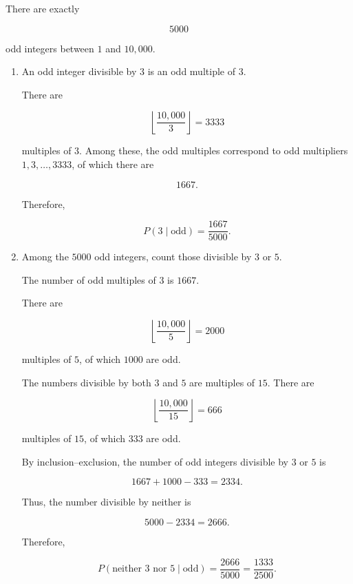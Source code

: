 \documentclass[11pt]{article}
\newenvironment{solution}{
    \par
    \begin{tcolorbox}[
        colback=white,
        colframe=uwgold,
        boxrule=0.7pt,
        arc=2mm,
        left=3mm,
        right=3mm,
        top=2mm,
        bottom=2mm,
        breakable,
        before skip=0.5em,
        after skip=1em,
        title=\textbf{Solution},
        coltitle=uwpurple,
        fonttitle=\bfseries
    ]
}{
    \end{tcolorbox}
}
\begin{document}
\begin{solution}

There are exactly

\[
5000
\]

odd integers between \(1\) and \(10{,}000\).

\begin{enumerate}[label=(\alph*)]

\item An odd integer divisible by \(3\) is an odd multiple of \(3\).

There are

\[
\left\lfloor\frac{10{,}000}{3}\right\rfloor
=
3333
\]

multiples of \(3\). Among these, the odd multiples correspond to odd
multipliers \(1,3,\ldots,3333\), of which there are

\[
1667.
\]

Therefore,

\[
 {
P(3\mid\text{odd})
=
\frac{1667}{5000}.
}
\]

\item Among the \(5000\) odd integers, count those divisible by \(3\) or
\(5\).

The number of odd multiples of \(3\) is \(1667\).

There are

\[
\left\lfloor\frac{10{,}000}{5}\right\rfloor=2000
\]

multiples of \(5\), of which \(1000\) are odd.

The numbers divisible by both \(3\) and \(5\) are multiples of \(15\).
There are

\[
\left\lfloor\frac{10{,}000}{15}\right\rfloor=666
\]

multiples of \(15\), of which \(333\) are odd.

By inclusion--exclusion, the number of odd integers divisible by \(3\) or
\(5\) is

\[
1667+1000-333=2334.
\]

Thus, the number divisible by neither is

\[
5000-2334=2666.
\]

Therefore,

\[
 {
P(\text{neither }3\text{ nor }5\mid\text{odd})
=
\frac{2666}{5000}
=
\frac{1333}{2500}.
}
\]

\end{enumerate}

\end{solution}
 
\end{document}
